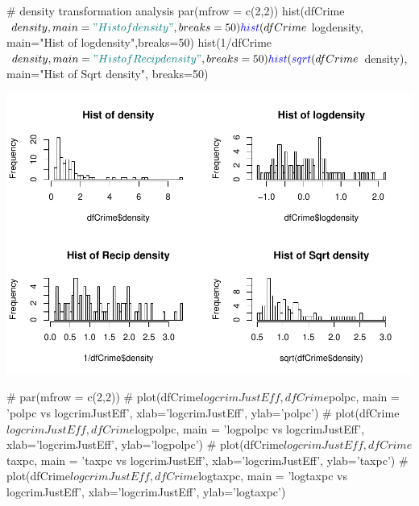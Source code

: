 \documentclass[]{article}
\newenvironment{Shaded}{}{}
\newcommand{\CommentTok}[1]{\textcolor[rgb]{0.00,0.50,0.00}{#1}}
\newcommand{\DataTypeTok}[1]{#1}
\newcommand{\DecValTok}[1]{#1}
\newcommand{\KeywordTok}[1]{\textcolor[rgb]{0.00,0.00,1.00}{#1}}
\newcommand{\NormalTok}[1]{#1}
\newcommand{\OperatorTok}[1]{#1}
\newcommand{\StringTok}[1]{\textcolor[rgb]{0.00,0.50,0.50}{#1}}
\begin{document}
\begin{Shaded}
\begin{Highlighting}[]
\CommentTok{# density transformation analysis }
\KeywordTok{par}\NormalTok{(}\DataTypeTok{mfrow =} \KeywordTok{c}\NormalTok{(}\DecValTok{2}\NormalTok{,}\DecValTok{2}\NormalTok{))}
\KeywordTok{hist}\NormalTok{(dfCrime}\OperatorTok{$}\NormalTok{density, }\DataTypeTok{main=}\StringTok{"Hist of density"}\NormalTok{, }\DataTypeTok{breaks=}\DecValTok{50}\NormalTok{)}
\KeywordTok{hist}\NormalTok{(dfCrime}\OperatorTok{$}\NormalTok{logdensity, }\DataTypeTok{main=}\StringTok{"Hist of logdensity"}\NormalTok{,}\DataTypeTok{breaks=}\DecValTok{50}\NormalTok{)}
\KeywordTok{hist}\NormalTok{(}\DecValTok{1}\OperatorTok{/}\NormalTok{dfCrime}\OperatorTok{$}\NormalTok{density, }\DataTypeTok{main=}\StringTok{"Hist of Recip density"}\NormalTok{, }\DataTypeTok{breaks=}\DecValTok{50}\NormalTok{)}
\KeywordTok{hist}\NormalTok{(}\KeywordTok{sqrt}\NormalTok{(dfCrime}\OperatorTok{$}\NormalTok{density), }\DataTypeTok{main=}\StringTok{"Hist of Sqrt density"}\NormalTok{, }\DataTypeTok{breaks=}\DecValTok{50}\NormalTok{)}
\end{Highlighting}
\end{Shaded}

\includegraphics{Bagnard_Gaustad_Hartman_Leung_Lab_3_files/figure-latex/unnamed-chunk-89-1.pdf}

\begin{Shaded}
\begin{Highlighting}[]
\CommentTok{# par(mfrow = c(2,2))}
\CommentTok{# plot(dfCrime$logcrimJustEff, dfCrime$polpc, main = 'polpc vs logcrimJustEff', xlab='logcrimJustEff', ylab='polpc')}
\CommentTok{# plot(dfCrime$logcrimJustEff, dfCrime$logpolpc, main = 'logpolpc vs logcrimJustEff', xlab='logcrimJustEff', ylab='logpolpc')}
\CommentTok{# plot(dfCrime$logcrimJustEff, dfCrime$taxpc, main = 'taxpc vs logcrimJustEff', xlab='logcrimJustEff', ylab='taxpc')}
\CommentTok{# plot(dfCrime$logcrimJustEff, dfCrime$logtaxpc, main = 'logtaxpc vs logcrimJustEff', xlab='logcrimJustEff', ylab='logtaxpc')}
\end{Highlighting}
\end{Shaded}
\end{document}
